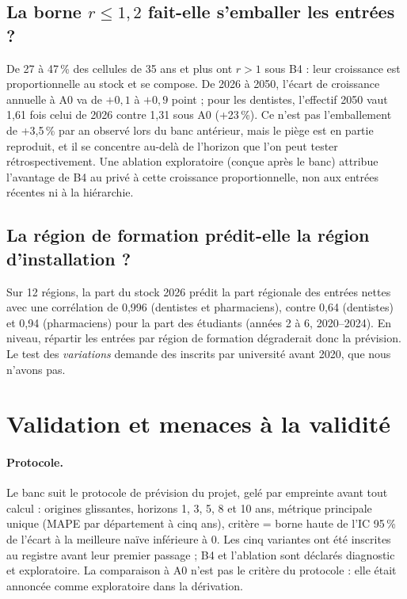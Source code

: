 \subsection{La borne $r \le 1{,}2$ fait-elle s'emballer les entrées ?}
De 27 à 47\,\%\mesure{} des cellules de 35 ans et plus ont $r > 1$ sous B4 : leur croissance est
proportionnelle au stock et se compose. De 2026 à 2050, l'écart de croissance annuelle à A0 va de
$+0{,}1$ à $+0{,}9$\mesure{} point ; pour les dentistes, l'effectif 2050 vaut 1,61 fois\mesure{}
celui de 2026 contre 1,31\mesure{} sous A0 (+23\,\%\mesure). Ce n'est pas l'emballement de
+3,5\,\% par an observé lors du banc antérieur, mais le piège est en partie reproduit, et il se
concentre au-delà de l'horizon que l'on peut tester rétrospectivement. Une ablation exploratoire
(conçue après le banc) attribue l'avantage de B4 au privé à cette croissance proportionnelle, non aux
entrées récentes ni à la hiérarchie.

\subsection{La région de formation prédit-elle la région d'installation ?}
Sur 12 régions, la part du stock 2026 prédit la part régionale des entrées nettes avec une
corrélation de 0,996\mesure{} (dentistes et pharmaciens), contre 0,64\mesure{} (dentistes) et
0,94\mesure{} (pharmaciens) pour la part des étudiants (années 2 à 6, 2020--2024). En niveau, répartir
les entrées par région de formation dégraderait donc la prévision. Le test des \emph{variations}
demande des inscrits par université avant 2020, que nous n'avons pas.

\section{Validation et menaces à la validité}
\paragraph{Protocole.} Le banc suit le protocole de prévision du projet, gelé par empreinte avant tout
calcul : origines glissantes, horizons 1, 3, 5, 8 et 10 ans, métrique principale unique (MAPE par
département à cinq ans), critère = borne haute de l'IC 95\,\% de l'écart à la meilleure naïve
inférieure à 0. Les cinq variantes ont été inscrites au registre avant leur premier passage ; B4 et
l'ablation sont déclarés diagnostic et exploratoire. La comparaison à A0 n'est pas le critère du
protocole : elle était annoncée comme exploratoire dans la dérivation.

